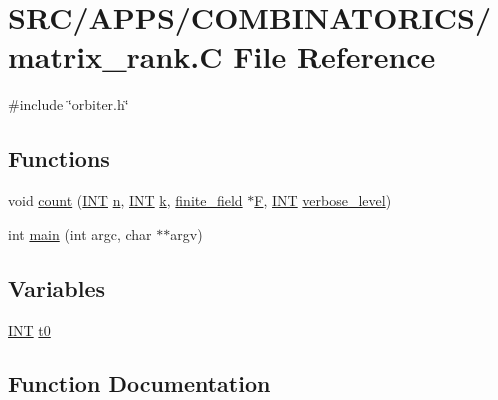 \hypertarget{matrix__rank_8_c}{}\section{S\+R\+C/\+A\+P\+P\+S/\+C\+O\+M\+B\+I\+N\+A\+T\+O\+R\+I\+C\+S/matrix\+\_\+rank.C File Reference}
\label{matrix__rank_8_c}
{\ttfamily \#include \char`\"{}orbiter.\+h\char`\"{}}\newline
\subsection*{Functions}
\begin{DoxyCompactItemize}
\item 
void \mbox{\hyperlink{matrix__rank_8_c_a14378915929fd8c79bc58c52a4bbaa3a}{count}} (\mbox{\hyperlink{galois_8h_a09fddde158a3a20bd2dcadb609de11dc}{I\+NT}} \mbox{\hyperlink{simeon_8_c_a7f2cd26777ce0ff3fdaf8d02aacbddfb}{n}}, \mbox{\hyperlink{galois_8h_a09fddde158a3a20bd2dcadb609de11dc}{I\+NT}} \mbox{\hyperlink{simeon_8_c_a43fa990200c3ddd47c35f151bd4d66bf}{k}}, \mbox{\hyperlink{classfinite__field}{finite\+\_\+field}} $\ast$\mbox{\hyperlink{simeon_8_c_a21a61c535ff7d9d4b674461d3b19fffa}{F}}, \mbox{\hyperlink{galois_8h_a09fddde158a3a20bd2dcadb609de11dc}{I\+NT}} \mbox{\hyperlink{simeon_8_c_a818073fbcc2f439e7c56952f67386122}{verbose\+\_\+level}})
\item 
int \mbox{\hyperlink{matrix__rank_8_c_a3c04138a5bfe5d72780bb7e82a18e627}{main}} (int argc, char $\ast$$\ast$argv)
\end{DoxyCompactItemize}
\subsection*{Variables}
\begin{DoxyCompactItemize}
\item 
\mbox{\hyperlink{galois_8h_a09fddde158a3a20bd2dcadb609de11dc}{I\+NT}} \mbox{\hyperlink{matrix__rank_8_c_a4268f4fe222ffb119218a0199f5e1904}{t0}}
\end{DoxyCompactItemize}


\subsection{Function Documentation}
\mbox{\label{matrix__rank_8_c_a14378915929fd8c79bc58c52a4bbaa3a}} 
